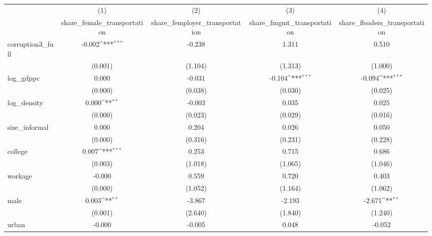 {
\def\sym#1{\ifmmode^{#1}\else\(^{#1}\)\fi}
\begin{tabular}{l*{4}{c}}
\hline\hline
            &\multicolumn{1}{c}{(1)}&\multicolumn{1}{c}{(2)}&\multicolumn{1}{c}{(3)}&\multicolumn{1}{c}{(4)}\\
            &\multicolumn{1}{c}{share\_female\_transportation}&\multicolumn{1}{c}{share\_femployer\_transportation}&\multicolumn{1}{c}{share\_fmgmt\_transportation}&\multicolumn{1}{c}{share\_fleaders\_transportation}\\
\hline
corruption3\_full&      -0.002\sym{***}&      -0.238         &       1.311         &       0.510         \\
            &     (0.001)         &     (1.104)         &     (1.313)         &     (1.000)         \\
[1em]
log\_gdppc   &       0.000         &      -0.031         &      -0.104\sym{***}&      -0.094\sym{***}\\
            &     (0.000)         &     (0.038)         &     (0.030)         &     (0.025)         \\
[1em]
log\_density &       0.000\sym{**} &      -0.003         &       0.035         &       0.025         \\
            &     (0.000)         &     (0.023)         &     (0.029)         &     (0.016)         \\
[1em]
size\_informal&       0.000         &       0.204         &       0.026         &       0.050         \\
            &     (0.000)         &     (0.316)         &     (0.231)         &     (0.228)         \\
[1em]
college     &       0.007\sym{***}&       0.253         &       0.715         &       0.686         \\
            &     (0.003)         &     (1.018)         &     (1.065)         &     (1.046)         \\
[1em]
workage     &      -0.000         &       0.559         &       0.720         &       0.403         \\
            &     (0.000)         &     (1.052)         &     (1.164)         &     (1.062)         \\
[1em]
male        &       0.003\sym{**} &      -3.867         &      -2.193         &      -2.671\sym{**} \\
            &     (0.001)         &     (2.640)         &     (1.840)         &     (1.240)         \\
[1em]
urban       &      -0.000         &      -0.005         &       0.048         &      -0.052         \\

\end{tabular}}
